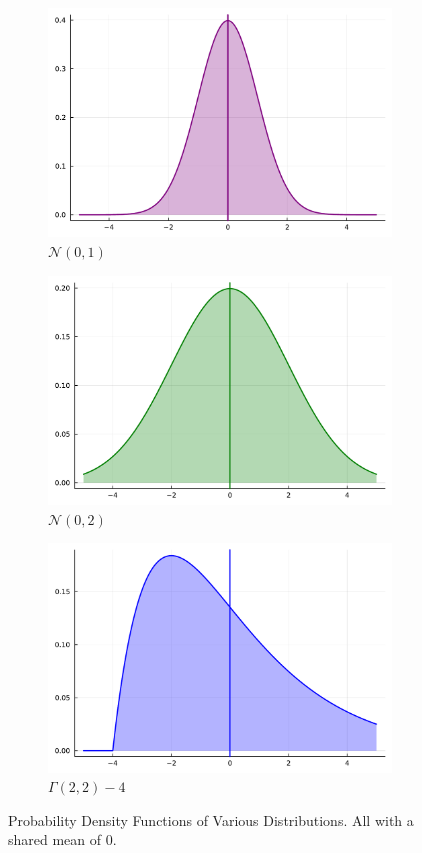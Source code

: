 \documentclass[10pt]{article}
\theoremstyle{plain}
\theoremstyle{remark}
\begin{document}
\begin{figure}[ht!]
        \begin{subfigure}[t]{0.5\textwidth}
                \centering
                \includegraphics[width=0.7\linewidth]{julia_figures/normal.pdf}
                \caption{$\mathcal{N}(0,1)$}
                \label{fig:normal}
        \end{subfigure}
        \begin{subfigure}[t]{0.5\textwidth}
                \centering
                \includegraphics[width=0.7\linewidth]{julia_figures/normal_wide.pdf}
                \caption{$\mathcal{N}(0,2)$}
                \label{fig:normal_wide}
        \end{subfigure}
        \begin{subfigure}[t]{1.0\textwidth}
                \centering
                \includegraphics[width=0.4\linewidth]{julia_figures/gamma.pdf}

                \caption{$\Gamma(2,2) - 4$}
                \label{fig:gamma}
        \end{subfigure}
        \caption{Probability Density Functions of Various Distributions. All with a shared mean of 0.}
        \label{fig:pdfs}
\end{figure}
\end{document}
